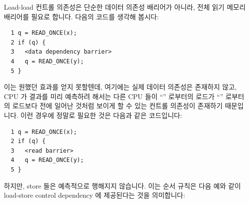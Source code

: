 \begin{enumerate}
Load-load 컨트롤 의존성은 단순한 데이터 의존성 배리어가 아니라, 전체 읽기
메모리 배리어를 필요로 합니다.
다음의 코드를 생각해 봅시다:

\vspace{5pt}
\begin{minipage}[t]{\columnwidth}
\scriptsize
\begin{verbatim}
  1 q = READ_ONCE(x);
  2 if (q) {
  3   <data dependency barrier>
  4   q = READ_ONCE(y);
  5 }
\end{verbatim}
\end{minipage}
\vspace{5pt}

이는 원했던 효과를 얻지 못할텐데, 여기에는 실제 데이터 의존성은 존재하지 않고,
CPU 가 결과를 미리 예측하려 해서는 다른 CPU 들이 ``'' 로부터의 로드가
``'' 로부터의 로드보다 전에 일어난 것처럼 보이게 할 수 있는 컨트롤
의존성이 존재하기 때문입니다.
이런 경우에 정말로 필요한 것은 다음과 같은 코드입니다:

\vspace{5pt}
\begin{minipage}[t]{\columnwidth}
\scriptsize
\begin{verbatim}
  1 q = READ_ONCE(x);
  2 if (q) {
  3   <read barrier>
  4   q = READ_ONCE(y);
  5 }
\end{verbatim}
\end{minipage}
\vspace{5pt}

하지만, store 들은 예측적으로 행해지지 않습니다.
이는 순서 규칙은 다음 예와 같이 load-store control dependency 에 제공된다는
것을 의미합니다:

\end{enumerate}
